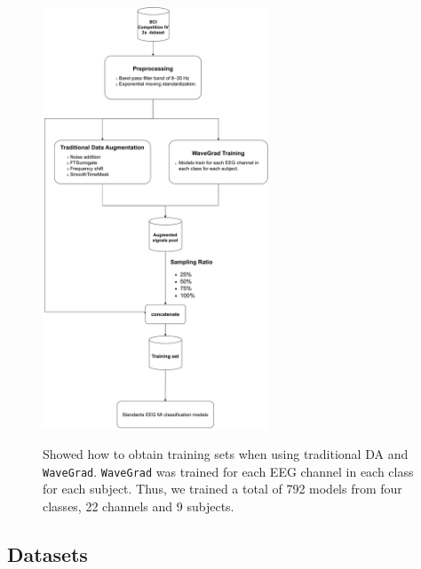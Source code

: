 \documentclass[runningheads]{llncs}
\begin{document}
\begin{figure}[ht]
  \centering
  \caption[System Diagram]{\label{fig:System Diagram} Showed how to obtain training sets when using traditional DA and \texttt{WaveGrad}. \texttt{WaveGrad} was trained for each EEG channel in each class for each subject. Thus, we trained a total of 792 models from four classes, 22 channels and 9 subjects.}
  \includegraphics[width=0.6\textwidth]{fig/dyagram.pdf}
  \label{fig:System}
\end{figure}
\subsection{Datasets}
\end{document}
